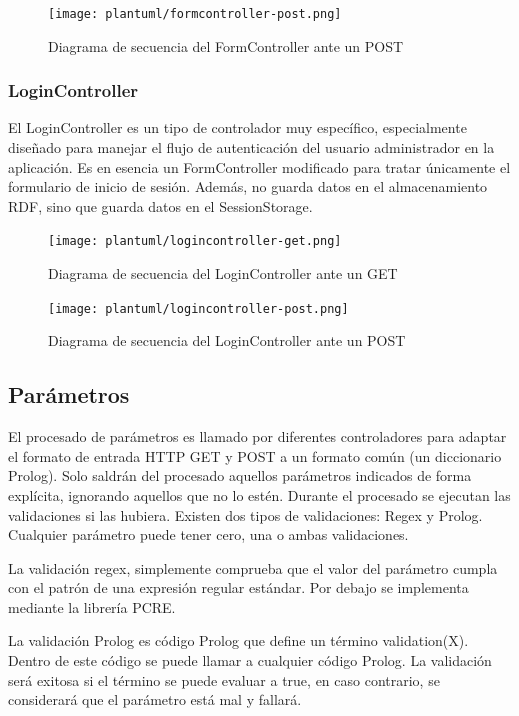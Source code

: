 \documentclass[12pt]{report} %
\begin{document}
\begin{figure}[h]
    \centering
    \texttt{[image: plantuml/formcontroller-post.png]}
    \caption{Diagrama de secuencia del FormController ante un POST}
    \label{fig:formcontrollerpost}
\end{figure}

\subsubsection{LoginController}

El LoginController es un tipo de controlador muy específico, especialmente diseñado para manejar el flujo de autenticación del usuario administrador en la aplicación. Es en esencia un FormController modificado para tratar únicamente el formulario de inicio de sesión. Además, no guarda datos en el almacenamiento RDF, sino que guarda datos en el SessionStorage.

\begin{figure}[h]
    \centering
    \texttt{[image: plantuml/logincontroller-get.png]}
    \caption{Diagrama de secuencia del LoginController ante un GET}
    \label{fig:logincontrollerget}
\end{figure}

\begin{figure}[h]
    \centering
    \texttt{[image: plantuml/logincontroller-post.png]}
    \caption{Diagrama de secuencia del LoginController ante un POST}
    \label{fig:logincontrollerpost}
\end{figure}

\subsection{Parámetros}
El procesado de parámetros es llamado por diferentes controladores para adaptar el formato de entrada HTTP GET y POST a un formato común (un diccionario Prolog).
Solo saldrán del procesado aquellos parámetros indicados de forma explícita, ignorando aquellos que no lo estén.
Durante el procesado se ejecutan las validaciones si las hubiera. Existen dos tipos de validaciones: Regex y Prolog.
Cualquier parámetro puede tener cero, una o ambas validaciones.

La validación regex, simplemente comprueba que el valor del parámetro cumpla con el patrón de una expresión regular estándar. Por debajo se implementa mediante la librería PCRE.

La validación Prolog es código Prolog que define un término validation(X). Dentro de este código se puede llamar a cualquier código Prolog.
La validación será exitosa si el término se puede evaluar a true, en caso contrario, se considerará que el parámetro está mal y fallará.
\end{document}
